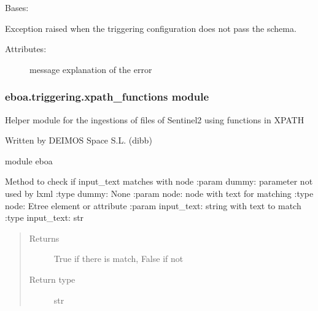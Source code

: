 
\begin{fulllineitems}
\label{\detokenize{eboa.triggering:eboa.triggering.errors.TriggeringConfigDoesNotPassSchema}}
Bases: {\hyperref[\detokenize{eboa.triggering:eboa.triggering.errors.Error}]{}}

Exception raised when the triggering configuration does not pass the schema.
\begin{description}
\item[{Attributes:}] \leavevmode
message \textendash{} explanation of the error

\end{description}

\end{fulllineitems}



\subsubsection{eboa.triggering.xpath\_functions module}
\label{\detokenize{eboa.triggering:module-eboa.triggering.xpath_functions}}\label{\detokenize{eboa.triggering:eboa-triggering-xpath-functions-module}}
Helper module for the ingestions of files of Sentinel\sphinxhyphen{}2 using functions in XPATH

Written by DEIMOS Space S.L. (dibb)

module eboa

\begin{fulllineitems}
\label{\detokenize{eboa.triggering:eboa.triggering.xpath_functions.match}}
Method to check if input\_text matches with node
:param dummy: parameter not used by lxml
:type dummy: None
:param node: node with text for matching
:type node: Etree element or attribute
:param input\_text: string with text to match
:type input\_text: str
\begin{quote}\begin{description}
\item[{Returns}] \leavevmode
True if there is match, False if not

\item[{Return type}] \leavevmode
str

\end{description}\end{quote}

\end{fulllineitems}



